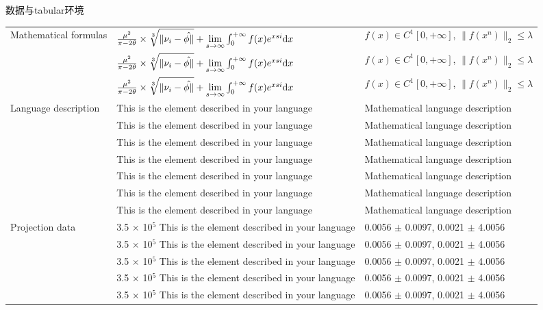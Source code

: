 \documentclass[UTF8, aspectratio=169 , 10pt，punct=kaiming]{beamer} %
\begin{document}
\begin{frame}{数据与tabular环境}
\begin{table}[H]
{\begin{tabular}{@{\extracolsep{\fill}}*{3}{l}}
      \hline
  \multirow{3}{*}{Mathematical formulas}
     & $\frac{\mu^2}{\pi-2\theta}\times \sqrt[3]{\|\nu_{i}-\hat{\phi\|}}+\lim\limits_{s\to\infty}\int_{0}^{+\infty}f(x)e^{xsi}{\rm d}x$ & $f(x)\in C^{1}[0,+\infty]$, $\|f(x^{n})\|_{2}\leqslant \lambda$ \\
     &$\frac{\mu^2}{\pi-2\theta}\times \sqrt[3]{\|\nu_{i}-\hat{\phi\|}}+\lim\limits_{s\to\infty}\int_{0}^{+\infty}f(x)e^{xsi}{\rm d}x$ & $f(x)\in C^{1}[0,+\infty]$, $\|f(x^{n})\|_{2}\leqslant \lambda$ \\
     & $\frac{\mu^2}{\pi-2\theta}\times \sqrt[3]{\|\nu_{i}-\hat{\phi\|}}+\lim\limits_{s\to\infty}\int_{0}^{+\infty}f(x)e^{xsi}{\rm d}x$ & $f(x)\in C^{1}[0,+\infty]$, $\|f(x^{n})\|_{2}\leqslant \lambda$ \\
     \hline
  \multirow{7}{*}{Language description}
      & This is the element described in your language & Mathematical language description \\
      & This is the element described in your language & Mathematical language description\\
      & This is the element described in your language & Mathematical language description \\
      & This is the element described in your language & Mathematical language description \\
      & This is the element described in your language & Mathematical language description \\
      & This is the element described in your language & Mathematical language description\\
      & This is the element described in your language & Mathematical language description\\
      \hline
  \multirow{8}{*}{Projection data}
      & 3.5 $\times$ 10$^{5}$ This is the element described in your language&  0.0056 $\pm$ 0.0097, 0.0021 $\pm$ 4.0056 \\
      & 3.5 $\times$ 10$^{5}$ This is the element described in your language&  0.0056 $\pm$ 0.0097, 0.0021 $\pm$ 4.0056 \\
      & 3.5 $\times$ 10$^{5}$ This is the element described in your language&  0.0056 $\pm$ 0.0097, 0.0021 $\pm$ 4.0056 \\
      & 3.5 $\times$ 10$^{5}$ This is the element described in your language&  0.0056 $\pm$ 0.0097, 0.0021 $\pm$ 4.0056 \\
      & 3.5 $\times$ 10$^{5}$ This is the element described in your language&  0.0056 $\pm$ 0.0097, 0.0021 $\pm$ 4.0056 \\

\end{tabular}}
\end{table}
\end{frame}
\end{document}
